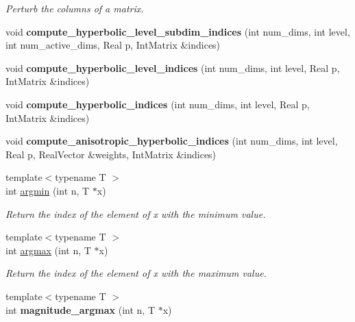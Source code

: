 \begin{DoxyCompactItemize}
\begin{DoxyCompactList}\small\item\em Perturb the columns of a matrix. \end{DoxyCompactList}\item 
void {\bfseries compute\+\_\+hyperbolic\+\_\+level\+\_\+subdim\+\_\+indices} (int num\+\_\+dims, int level, int num\+\_\+active\+\_\+dims, Real p, Int\+Matrix \&indices)\label{MathTools_8cpp_a2d19e5607ec804c7aea5d72bbb6d5ee2}

\item 
void {\bfseries compute\+\_\+hyperbolic\+\_\+level\+\_\+indices} (int num\+\_\+dims, int level, Real p, Int\+Matrix \&indices)\label{MathTools_8cpp_aaa76922a307be0a1036eb021c2c1e098}

\item 
void {\bfseries compute\+\_\+hyperbolic\+\_\+indices} (int num\+\_\+dims, int level, Real p, Int\+Matrix \&indices)\label{MathTools_8cpp_abdb101758a21f0573a95e255fd8cadaa}

\item 
void {\bfseries compute\+\_\+anisotropic\+\_\+hyperbolic\+\_\+indices} (int num\+\_\+dims, int level, Real p, Real\+Vector \&weights, Int\+Matrix \&indices)\label{MathTools_8cpp_afdee9e6de3a413adf7ae2c94ad189e57}

\item 
{\footnotesize template$<$typename T $>$ }\\int \hyperlink{MathTools_8hpp_a84e06f141aa8d0e6d076c5176c17107d}{argmin} (int n, T $\ast$x)
\begin{DoxyCompactList}\small\item\em Return the index of the element of x with the minimum value. \end{DoxyCompactList}\item 
{\footnotesize template$<$typename T $>$ }\\int \hyperlink{MathTools_8hpp_a7d0662e44ce4fd29e278afcea55f908b}{argmax} (int n, T $\ast$x)
\begin{DoxyCompactList}\small\item\em Return the index of the element of x with the maximum value. \end{DoxyCompactList}\item 
{\footnotesize template$<$typename T $>$ }\\int {\bfseries magnitude\+\_\+argmax} (int n, T $\ast$x)\label{MathTools_8hpp_a66516a769717c1c801554ff29a832c37}


\end{DoxyCompactItemize}
